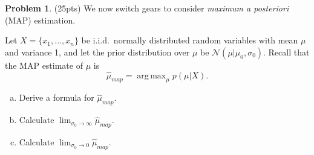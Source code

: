 \documentclass[10pt]{article}
\theoremstyle{definition}
\newtheorem{problem}{Problem}
\DeclareMathOperator*{\argmax}{arg\,max}
\newcommand{\map}[1]{\hat{#1}_{\textit{map}}}
\newcommand{\normal}{\mathcal{N}}
\begin{document}
\newpage
\begin{problem}
    (25pts)
    We now switch gears to consider \emph{maximum a posteriori} (MAP) estimation.

    Let $X=\{x_1,...,x_n\}$ be i.i.d.\ normally distributed random variables with mean $\mu$ and variance 1, and
    let the prior distribution over $\mu$ be $\normal(\mu|\mu_0,\sigma_0)$.
    Recall that the MAP estimate of $\mu$ is 
    \begin{equation}
        \map\mu = \argmax_\mu p(\mu|X)
        .
    \end{equation}
    \begin{enumerate}[(a)]
        \item Derive a formula for $\map\mu$.
        \vspace{5in}
        \item Calculate $\displaystyle\lim_{\sigma_0\to\infty}\map\mu$.
        \vspace{1in}
        \item Calculate $\displaystyle\lim_{\sigma_0\to0}\map\mu$.
    \end{enumerate}
\end{problem}

\end{document}
